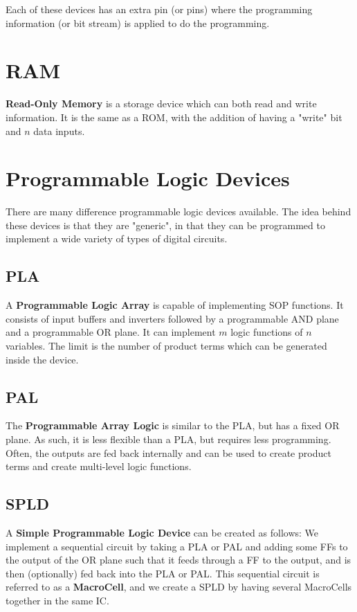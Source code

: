 \documentclass[12pt]{article}
\begin{document}
Each of these devices has an extra pin (or pins) where the programming information (or bit stream) is applied to do the programming.

\section*{RAM}
{\bf Read-Only Memory} is a storage device which can both read and write information. It is the same as a ROM, with the addition of having a "write" bit and $n$ data inputs.

\section*{Programmable Logic Devices}
There are many difference programmable logic devices available. The idea behind these devices is that they are "generic", in that they can be programmed to implement a wide variety of types of digital circuits.

\subsection*{PLA}
A {\bf Programmable Logic Array} is capable of implementing SOP functions. It consists of input buffers and inverters followed by a programmable AND plane and a programmable OR plane. It can implement $m$ logic functions of $n$ variables. The limit is the number of product terms which can be generated inside the device.

\subsection*{PAL}
The {\bf Programmable Array Logic} is similar to the PLA, but has a fixed OR plane. As such, it is less flexible than a PLA, but requires less programming. Often, the outputs are fed back internally and can be used to create product terms and create multi-level logic functions.

\subsection*{SPLD}
A {\bf Simple Programmable Logic Device} can be created as follows: We implement a sequential circuit by taking a PLA or PAL and adding some FFs to the output of the OR plane such that it feeds through a FF to the output, and is then (optionally) fed back into the PLA or PAL. This sequential circuit is referred to as a {\bf MacroCell}, and we create a SPLD by having several MacroCells together in the same IC.
\end{document}
